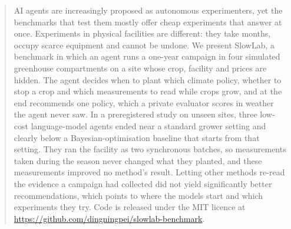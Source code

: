 \begin{abstract}
AI agents are increasingly proposed as autonomous experimenters, yet the benchmarks that test them mostly offer cheap experiments that answer at once. Experiments in physical facilities are different: they take months, occupy scarce equipment and cannot be undone. We present SlowLab, a benchmark in which an agent runs a one-year campaign in four simulated greenhouse compartments on a site whose crop, facility and prices are hidden. The agent decides when to plant which climate policy, whether to stop a crop and which measurements to read while crops grow, and at the end recommends one policy, which a private evaluator scores in weather the agent never saw. In a preregistered study on  unseen sites, three low-cost language-model agents ended near a standard grower setting and clearly below a Bayesian-optimisation baseline that starts from that setting. They ran the facility as two synchronous batches, so measurements taken during the season never changed what they planted, and these measurements improved no method's result. Letting other methods re-read the evidence a campaign had collected did not yield significantly better recommendations, which points to where the models start and which experiments they try. Code is released under the MIT licence at \url{https://github.com/dingningpei/slowlab-benchmark}.
\end{abstract}

